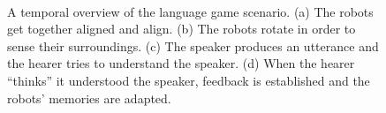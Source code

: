 \begin{figure}
\centering
{}
\\
\caption{A temporal overview of the language game scenario. (a) The robots get together aligned and align. (b) The robots rotate in order to sense their surroundings. (c) The speaker produces an utterance and the hearer tries to understand the speaker. (d) When the hearer ``thinks'' it understood the speaker, feedback is established and the robots' memories are adapted.}
\label{f:scheme}
\end{figure}

